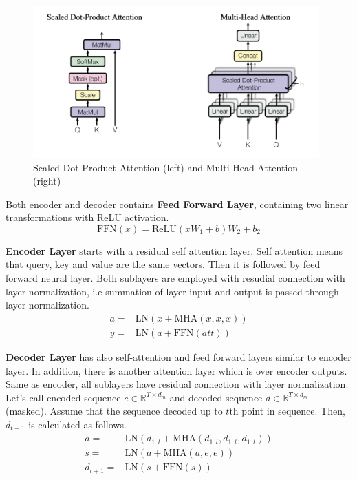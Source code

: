 \begin{figure}
	\centering
	\includegraphics[width=0.98\textwidth]{figures/ml_theory/att.png}
	\caption{Scaled Dot-Product Attention (left) and Multi-Head Attention (right)}
	\label{fig:att_and_mha}
\end{figure}

Both encoder and decoder contains \textbf{Feed Forward Layer}, containing two linear transformations with ReLU activation.
\begin{equation}
\mathrm{FFN}(x) = \text{ReLU}(xW_1+b)W_2+b_2
\end{equation}

\textbf{Encoder Layer} starts with a residual self attention layer. 
Self attention means that query, key and value are the same vectors. 
Then it is followed by feed forward neural layer. 
Both sublayers are employed with resudial connection with layer normalization, 
i.e summation of layer input and output is passed through layer normalization. 
\begin{equation}
\begin{split}
a = & \mathrm{LN}(x + \mathrm{MHA}(x,x,x)) \\
y = & \mathrm{LN}(a + \mathrm{FFN}(att))
\end{split}
\end{equation}

\textbf{Decoder Layer} has also self-attention and feed forward layers similar to encoder layer. 
In addition, there is another attention layer which is over encoder outputs. 
Same as encoder, all sublayers have residual connection with layer normalization. 
Let's call encoded sequence $e \in \mathbb{R}^{T \times d_m}$ and decoded sequence $d \in \mathbb{R}^{T \times d_m}$ (masked). 
Assume that the sequence decoded up to $t$th point in sequence. 
Then, $d_{t+1}$ is calculated as follows. 
\begin{equation}
\begin{split}
a = & \mathrm{LN}(d_{1:t}+\mathrm{MHA}(d_{1:t},d_{1:t},d_{1:t})) \\
s = & \mathrm{LN}(a + \mathrm{MHA}(a,e,e)) \\
d_{t+1} = & \mathrm{LN}(s+ \mathrm{FFN}(s))
\end{split}
\end{equation}

